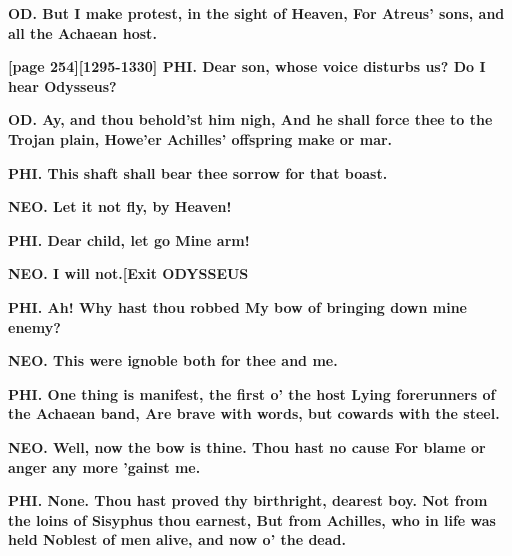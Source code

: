 \documentclass[11pt,letter]{book}
\begin{document}
\par \textbf{OD. But I make protest, in the sight of Heaven, For Atreus’ sons, and all the Achaean host.}
\par 

\par \textbf{[page 254][1295-1330] PHI. Dear son, whose voice disturbs us? Do I hear Odysseus?}
\par 

\par \textbf{OD. Ay, and thou behold’st him nigh, And he shall force thee to the Trojan plain, Howe’er Achilles’ offspring make or mar.}
\par 

\par \textbf{PHI. This shaft shall bear thee sorrow for that boast.}
\par 

\par \textbf{NEO. Let it not fly, by Heaven!}
\par 

\par \textbf{PHI. Dear child, let go Mine arm!}
\par 

\par \textbf{NEO. I will not.[Exit ODYSSEUS}
\par 

\par \textbf{PHI. Ah! Why hast thou robbed My bow of bringing down mine enemy?}
\par 

\par \textbf{NEO. This were ignoble both for thee and me.}
\par 

\par \textbf{PHI. One thing is manifest, the first o’ the host Lying forerunners of the Achaean band, Are brave with words, but cowards with the steel.}
\par 

\par \textbf{NEO. Well, now the bow is thine. Thou hast no cause For blame or anger any more ’gainst me.}
\par 

\par \textbf{PHI. None. Thou hast proved thy birthright, dearest boy. Not from the loins of Sisyphus thou earnest, But from Achilles, who in life was held Noblest of men alive, and now o’ the dead.}
\par 
\end{document}
